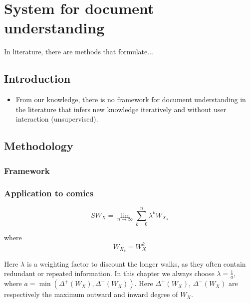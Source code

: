 \chapter{System for document understanding} %
\label{chap:hp}
\graphicspath{{./chapters/8-hp/figs/}}

In literature, there are methods that formulate...

\section{Introduction}
\label{sec:hp:intro}

\begin{itemize}
	\item From our knowledge, there is no framework for document understanding in the literature that infers new knowledge iteratively and without user interaction (unsupervised).
\end{itemize}

\section{Methodology}
\label{sec:hp:method}


\subsection{Framework}
\label{sub:hp:rw}


\subsection{Application to comics} %
\label{sub:hp:application_to_comics}


\begin{equation}
SW_X=\lim_{n\rightarrow \infty}\sum_{k=0}^n \lambda^k W_{X_k}
\label{eqn:pg:rw1}
\end{equation}

where
\begin{equation}
W_{X_k} = W_X^k
\end{equation}

Here $\lambda$ is a weighting factor to discount the longer walks, as they often contain redundant or repeated information. In this chapter we always choose $\lambda=\frac{1}{a}$, where $a=\min(\Delta^+(W_X),\Delta^-(W_X))$. Here $\Delta^+(W_X)$, $\Delta^-(W_X)$ are respectively the maximum outward and inward degree of $W_X$.

